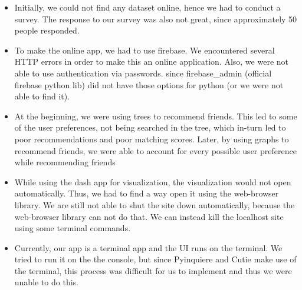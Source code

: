 \documentclass[11pt]{report}
\begin{document}
\begin{itemize}
    \item Initially, we could not find any dataset online, hence we had to conduct a survey. The response to our survey was also not great, since approximately 50 people responded.
    
    \item To make the online app, we had to use firebase. We encountered several HTTP errors in order to make this an online application. Also, we were not able to use authentication via passwords. since firebase\_admin (official firebase python lib) did not have those options for python (or we were not able to find it).
    
    \item At the beginning, we were using trees to recommend friends.  This led to some of the user preferences, not being searched in the tree, which  in-turn led to poor recommendations and poor matching scores.
    Later, by using graphs to recommend friends, we were able to account for every possible user preference while recommending friends
    
    \item While using the dash app for visualization, the visualization would not open automatically. Thus, we had to find a way open it using the web-browser library. We are still not able to shut the site down automatically, because the web-browser library can not do that. We can instead kill the localhost site using some terminal commands.
    
    
    \item Currently, our app is a terminal app and the UI runs on the terminal. We tried  to run it on the the console, but since Pyinquiere and Cutie make use of the terminal, this process was difficult for us to implement and thus we were unable to do this.
\end{itemize}
\end{document}

